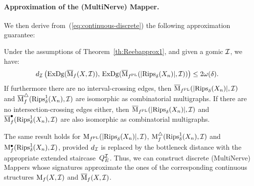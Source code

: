 \paragraph*{Approximation of the (MultiNerve) Mapper.} We then derive from~(\ref{eq:continuous-discrete}) the
following approximation guarantee:
%
\begin{thm}\label{th:sig-approx}
Under the assumptions of Theorem~\ref{th:Reebapprox1}, and given a gomic $\mathcal{I}$, we have:
%
\[ 
d_{\mathcal{I}}\left(\mathrm{ExDg}(\overline{\mathrm{M}}_{f}(X, \mathcal{I})), \, \mathrm{ExDg}(\overline{\mathrm{M}}_{f^{\rm PL}}(|\mathrm{Rips}_\delta(X_n)|, \mathcal{I}))\right)\leq 2\omega(\delta).
\]
%
If furthermore there are no interval-crossing edges, then
$\overline{\mathrm{M}}_{f^{\rm PL}}(|\mathrm{Rips}_\delta(X_n)|, \mathcal{I})$ and
$\overline{\rm M}^\triangle_{f}(\mathrm{Rips}^1_\delta(X_n), \mathcal{I})$ are isomorphic as combinatorial multigraphs. If there are no
intersection-crossing edges either, then $\overline{\mathrm{M}}_{f^{\rm PL}}(|\mathrm{Rips}_\delta(X_n)|, \mathcal{I})$ and
$\overline{\rm M}^\bullet_{f}(\mathrm{Rips}^1_\delta(X_n), \mathcal{I})$ are also isomorphic as combinatorial multigraphs.
\end{thm}
% 
The same result holds for $\mathrm{M}_{f^{\rm PL}}(|\mathrm{Rips}_\delta(X_n)|, \mathcal{I})$,
${\rm M}^\triangle_{f}(\mathrm{Rips}^1_\delta(X_n), \mathcal{I})$ and
${\rm M}^\bullet_{f}(\mathrm{Rips}^1_\delta(X_n), \mathcal{I})$, provided $d_{\mathcal{I}}$ is replaced by
the bottleneck distance with the appropriate extended
staircase~$Q_{E}^{\mathcal{I}}$.  Thus, we can construct discrete (MultiNerve)
Mappers whose signatures approximate the ones of the corresponding
continuous structures $\mathrm{M}_{f}(X, \mathcal{I})$ and $\overline{\mathrm{M}}_{f}(X, \mathcal{I})$.

